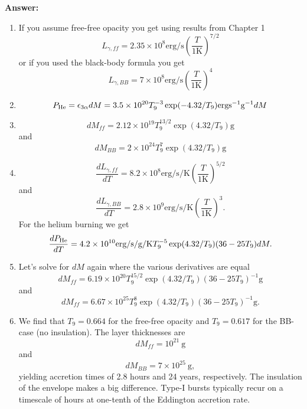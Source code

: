 \documentclass{article}
\begin{document}
\begin{enumerate}
\begin{enumerate}
\end{enumerate}
{\bf Answer:}
\begin{enumerate}
\item If you assume free-free opacity you get using results from
  Chapter 1
$$
L_{\gamma,ff} = 2.35 \times 10^{8} \textrm{erg/s} \left (
  \frac{T}{1\textrm{K}}\right )^{7/2}
$$
or if you used the black-body formula you get
$$
L_{\gamma,BB} = 7 \times 10^{8} \textrm{erg/s} \left (
  \frac{T}{1\textrm{K}}\right )^4
$$
\item
$$
P_\textrm{\scriptsize He} = \epsilon_{3\alpha} dM =
3.5 \times 10^{20} T_9^{-3} \exp(-4.32/T_9) \mathrm{erg s}^{-1}
\mathrm{g}^{-1} dM
$$
\item 
$$
dM_{ff} = 2.12 \times 10^{19} T_9^{13/2} \exp (4.32/T_9) \textrm{g}
$$
and 
$$
dM_{BB} = 2 \times 10^{24} T_9^{7} \exp (4.32/T_9) \textrm{g}
$$
\item
$$
\frac{dL_{\gamma,ff}}{dT} = 8.2 \times 10^8 \textrm{erg/s/K} \left (
  \frac{T}{1\textrm{K}} \right)^{5/2}
$$
and
$$
\frac{dL_{\gamma,BB}}{dT} = 2.8 \times 10^9 \textrm{erg/s/K} \left (
  \frac{T}{1\textrm{K}} \right)^3.
$$
For the helium burning we get
$$
\frac{dP_\textrm{\scriptsize He}}{dT} = 4.2 \times 10^{10}
\textrm{erg/s/g/K} T_9^{-5} \exp (4.32/T_9) (36 - 25 T_9) dM.
$$
\item
Let's solve for $dM$ again where the various derivatives are equal
$$
dM_{ff} = 6.19 \times 10^{20} T_9^{15/2} \exp(4.32/T_9) (36 - 25
T_9)^{-1} \textrm{g}
$$
and
$$
dM_{ff} = 6.67 \times 10^{25} T_9^{8} \exp(4.32/T_9) (36 - 25
T_9)^{-1} \textrm{g}.
$$
\item
We find that $T_9 = 0.664$ for the free-free opacity and $T_9=0.617$
for the BB-case (no insulation).  The layer thicknesses are
$$
dM_{ff} = 10^{21}~\textrm{g}
$$
and
$$
dM_{BB} = 7 \times 10^{25}~\textrm{g},
$$
yielding accretion times of 2.8 hours and 24 years, respectively.  The insulation of the envelope makes a big difference. Type-I bursts typically recur on a timescale of hours at one-tenth of the Eddington accretion rate.
\end{enumerate}
\end{enumerate}
\ifx\bookloaded\undefined
\end{document}

